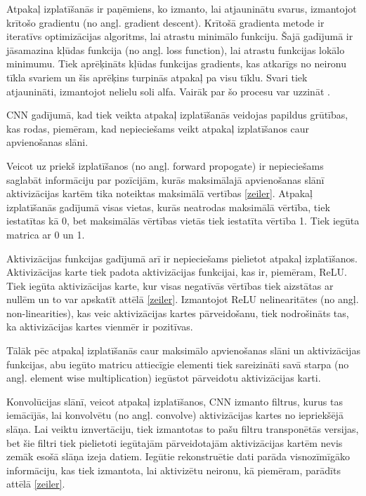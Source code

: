 \documentclass[12pt,paper=A4]{report}
\begin{document}
Atpakaļ izplatīšanās ir paņēmiens, ko izmanto, lai atjauninātu svarus, izmantojot krītošo gradientu (no angļ. gradient descent). Krītošā gradienta metode ir iteratīvs optimizācijas algoritms, lai atrastu minimālo funkciju. Šajā gadījumā ir jāsamazina kļūdas funkcija (no angļ. loss function), lai atrastu funkcijas lokālo minimumu. Tiek aprēķināts kļūdas funkcijas gradients, kas atkarīgs no neironu tīkla svariem un šis aprēķins turpinās atpakaļ pa visu tīklu. Svari tiek atjaunināti, izmantojot nelielu soli alfa. Vairāk par šo procesu var uzzināt \cite{cui2018applying}.

CNN gadījumā, kad tiek veikta atpakaļ izplatīšanās veidojas papildus grūtības, kas rodas, piemēram, kad nepieciešams veikt atpakaļ izplatīšanos caur apvienošanas slāni.  

Veicot uz priekš izplatīšanos (no angļ. forward propogate) ir nepieciešams saglabāt informāciju par pozīcijām, kurās maksimālajā apvienošanas slānī aktivizācijas kartēm tika noteiktas maksimālā vertības \ref{zeiler}. Atpakaļ izplatīšanās gadījumā visas vietas, kurās neatrodas maksimālā vērtība, tiek iestatītas kā 0, bet maksimālās vērtības vietās tiek iestatīta vērtība 1. Tiek iegūta matrica ar 0 un 1. \cite{https://medium.com/coinmonks/backpropagation-concept-explained-in-5-levels-of-difficulty-8b220a939db5}

Aktivizācijas funkcijas gadījumā arī ir nepieciešams pielietot atpakaļ izplatīšanos. Aktivizācijas karte tiek padota aktivizācijas funkcijai, kas ir, piemēram, ReLU. Tiek iegūta aktivizācijas karte, kur visas negatīvās vērtības tiek aizstātas ar nullēm un to var apskatīt attēlā \ref{zeiler}. Izmantojot ReLU nelinearitātes (no angļ. non-linearities), kas veic aktivizācijas kartes pārveidošanu, tiek nodrošināts tas, ka aktivizācijas kartes vienmēr ir pozitīvas.
 
Tālāk pēc atpakaļ izplatīšanās caur maksimālo apvienošanas slāni un aktivizācijas funkcijas, abu iegūto matricu attiecīgie elementi tiek sareizināti savā starpa (no angļ. element wise multiplication) iegūstot pārveidotu aktivizācijas karti.  

Konvolūcijas slānī, veicot atpakaļ izplatīšanos, CNN izmanto filtrus, kurus tas iemācījās, lai konvolvētu (no angļ. convolve) aktivizācijas kartes no iepriekšējā slāņa. Lai veiktu iznvertāciju, tiek izmantotas to pašu filtru transponētās versijas, bet šie filtri tiek pielietoti iegūtajām pārveidotajām aktivizācijas kartēm nevis zemāk esošā slāņa izeja datiem. Iegūtie rekonstruētie dati parāda visnozīmīgāko informāciju, kas tiek izmantota, lai aktivizētu neironu, kā piemēram, parādīts attēlā \ref{zeiler}. \cite{zeiler2014visualizing} 
\end{document}
